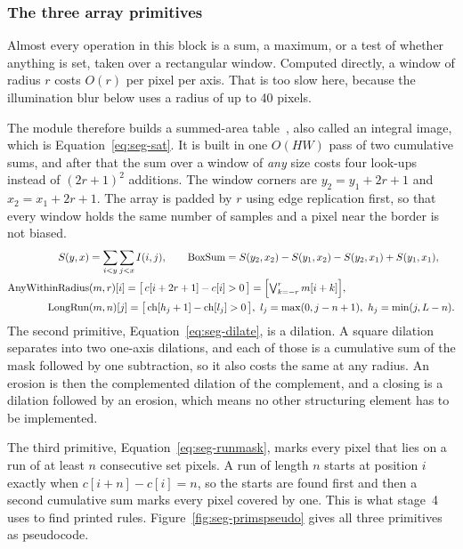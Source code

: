 \subsubsection{The three array primitives}

Almost every operation in this block is a sum, a maximum, or a test of whether anything is set, taken over a rectangular window. Computed directly, a window of radius $r$ costs $O(r)$ per pixel per axis. That is too slow here, because the illumination blur below uses a radius of up to 40 pixels.

The module therefore builds a summed-area table~\cite{crow1984}, also called an integral image, which is Equation~\ref{eq:seg-sat}. It is built in one $O(HW)$ pass of two cumulative sums, and after that the sum over a window of \emph{any} size costs four look-ups instead of $(2r+1)^2$ additions. The window corners are $y_2=y_1+2r+1$ and $x_2=x_1+2r+1$. The array is padded by $r$ using edge replication first, so that every window holds the same number of samples and a pixel near the border is not biased.
\begin{align}
S(y,x)&=\sum_{i<y}\sum_{j<x} I(i,j),\qquad
\mathrm{BoxSum}=S(y_2,x_2)-S(y_1,x_2)-S(y_2,x_1)+S(y_1,x_1),\label{eq:seg-sat}\\
\mathrm{AnyWithinRadius}&(m,r)[i]=\bigl[\,c[i+2r+1]-c[i]>0\,\bigr]=\Bigl[\textstyle\bigvee_{k=-r}^{r} m[i+k]\Bigr],\label{eq:seg-dilate}\\
\mathrm{LongRun}&(m,n)[j]=\bigl[\,\mathrm{ch}[h_j+1]-\mathrm{ch}[l_j]>0\,\bigr],\ l_j=\max(0,j-n+1),\ h_j=\min(j,L-n).\label{eq:seg-runmask}
\end{align}
The second primitive, Equation~\ref{eq:seg-dilate}, is a dilation. A square dilation separates into two one-axis dilations, and each of those is a cumulative sum of the mask followed by one subtraction, so it also costs the same at any radius. An erosion is then the complemented dilation of the complement, and a closing is a dilation followed by an erosion, which means no other structuring element has to be implemented.

The third primitive, Equation~\ref{eq:seg-runmask}, marks every pixel that lies on a run of at least $n$ consecutive set pixels. A run of length $n$ starts at position $i$ exactly when $c[i+n]-c[i]=n$, so the starts are found first and then a second cumulative sum marks every pixel covered by one. This is what stage~4 uses to find printed rules. Figure~\ref{fig:seg-primspseudo} gives all three primitives as pseudocode.

